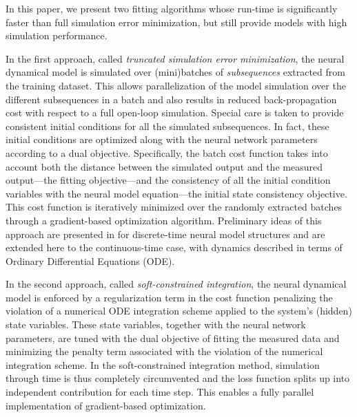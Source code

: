 \documentclass{article} %
\begin{document}
In this paper, we present two fitting algorithms 
whose run-time is significantly faster than full simulation error minimization, but still provide models with high simulation performance. 

In the first approach, called  \emph{truncated simulation error minimization}, the neural dynamical model is simulated over (mini)batches of 
\emph{subsequences} extracted from the training dataset. This allows parallelization of the model simulation over the different subsequences in a batch and also results in reduced back-propagation cost with respect to a full open-loop simulation. 
Special care is taken to provide consistent initial conditions for all the simulated subsequences. In fact, these initial conditions are optimized along with the neural network parameters according to a dual objective. Specifically, the batch cost function takes into account both the distance between the simulated output and the measured output---the fitting objective---and the consistency of all the initial condition variables with the neural model equation---the initial state consistency objective. This cost function is iteratively minimized over the randomly extracted batches through a gradient-based optimization algorithm.
Preliminary ideas of this approach are presented  in \cite{forgione20Uz} for discrete-time 
neural model structures and are extended here to the continuous-time case, with dynamics described in terms of Ordinary Differential Equations (ODE).


In the second approach, called \emph{soft-constrained integration},   
the neural dynamical model is enforced by a regularization term in the cost function penalizing the violation of a numerical ODE integration scheme applied to the system's (hidden) state variables.
These state variables, together with the neural network parameters, are tuned with the dual objective of fitting the measured data and minimizing the penalty term associated with the violation of the numerical integration scheme.
In the soft-constrained integration method, simulation through time is thus completely circumvented and the loss function splits up into independent contribution for each time step. This enables a fully parallel implementation of gradient-based optimization.
\end{document}

